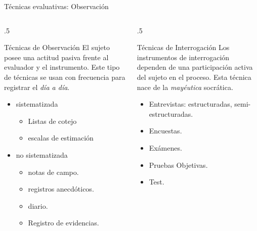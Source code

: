 \documentclass[11pt, aspectratio=169, xcolor=table,hyphens]{beamer}
\begin{document}
\begin{frame}{Técnicas evaluativas: Observación}
	\begin{columns}
		\begin{column}{.5\linewidth}
			\begin{block}{Técnicas de Observación}
				El sujeto posee una actitud pasiva frente al evaluador y el instrumento. Este tipo de técnicas se usan con frecuencia para registrar el \textit{día a día}.
				\begin{itemize}
					\item sistematizada
					      \begin{itemize}
						      \item Listas de cotejo
						      \item<2-> escalas de estimación
					      \end{itemize}
					\item no sistematizada
					      \begin{itemize}
						      \item<3-> notas de campo.
						      \item<4-> registros anecdóticos.
						      \item<5-> diario.
						      \item<6-> Registro de evidencias.
					      \end{itemize}
				\end{itemize}
			\end{block}
		\end{column}
		\begin{column}{.5\linewidth}
			\begin{block}{Técnicas de Interrogación}
				\justifying
				Los instrumentos de interrogación dependen de una participación activa del sujeto en el proceso. Esta técnica nace de la \textit{mayéutica} socrática.
				\begin{itemize}
					\item<7-> Entrevistas: estructuradas, semi-estructuradas.
					\item<8-> Encuestas.
					\item<9-> Exámenes.
					\item<10-> Pruebas Objetivas.
					\item<11-> Test.
				\end{itemize}
			\end{block}
		\end{column}
	\end{columns}
\end{frame}
\end{document}
